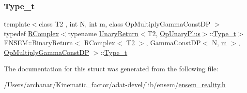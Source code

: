 \subsubsection{\texorpdfstring{Type\_t}{Type\_t}\hspace{0.1cm}{\footnotesize\ttfamily [3/3]}}
{\footnotesize\ttfamily template$<$class T2 , int N, int m, class Op\+Multiply\+Gamma\+Const\+DP $>$ \\
typedef \mbox{\hyperlink{classENSEM_1_1RComplex}{R\+Complex}}$<$typename \mbox{\hyperlink{structENSEM_1_1UnaryReturn}{Unary\+Return}}$<$T2, \mbox{\hyperlink{structENSEM_1_1OpUnaryPlus}{Op\+Unary\+Plus}}$>$\+::\mbox{\hyperlink{structENSEM_1_1BinaryReturn_3_01RComplex_3_01T2_01_4_00_01GammaConstDP_3_01N_00_01m_01_4_00_01OpMultiplyGammaConstDP_01_4_aea7c67b0aab65299ac861f01f5ec8737}{Type\+\_\+t}}$>$ \mbox{\hyperlink{structENSEM_1_1BinaryReturn}{E\+N\+S\+E\+M\+::\+Binary\+Return}}$<$ \mbox{\hyperlink{classENSEM_1_1RComplex}{R\+Complex}}$<$ T2 $>$, \mbox{\hyperlink{classENSEM_1_1GammaConstDP}{Gamma\+Const\+DP}}$<$ \mbox{\hyperlink{adat__devel_2lib_2hadron_2operator__name__util_8cc_a7722c8ecbb62d99aee7ce68b1752f337}{N}}, m $>$, \mbox{\hyperlink{structENSEM_1_1OpMultiplyGammaConstDP}{Op\+Multiply\+Gamma\+Const\+DP}} $>$\+::\mbox{\hyperlink{structENSEM_1_1BinaryReturn_3_01RComplex_3_01T2_01_4_00_01GammaConstDP_3_01N_00_01m_01_4_00_01OpMultiplyGammaConstDP_01_4_aea7c67b0aab65299ac861f01f5ec8737}{Type\+\_\+t}}}



The documentation for this struct was generated from the following file\+:\begin{DoxyCompactItemize}
\item 
/\+Users/archanar/\+Kinematic\+\_\+factor/adat-\/devel/lib/ensem/\mbox{\hyperlink{adat-devel_2lib_2ensem_2ensem__reality_8h}{ensem\+\_\+reality.\+h}}\end{DoxyCompactItemize}
